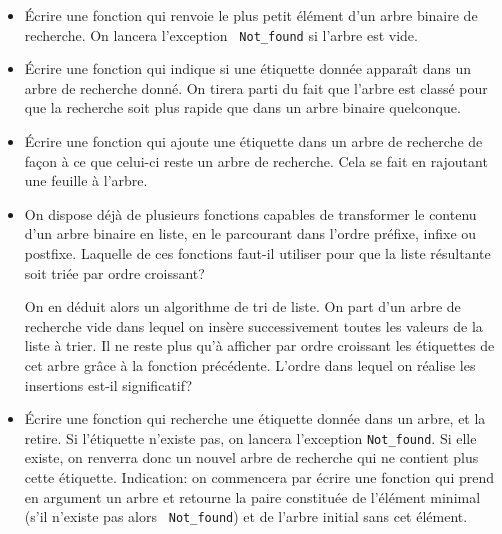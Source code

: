 \documentclass[11pt, a4paper]{article}
\begin{document}
\begin{itemize}

  \item Écrire une fonction qui renvoie le plus petit élément d'un
        arbre binaire de recherche. On lancera l'exception {\tt
        Not\_found} si l'arbre est vide.

  \item Écrire une fonction qui indique si une étiquette donnée
        apparaît dans un arbre de recherche donné. On tirera parti du
        fait que l'arbre est classé pour que la recherche soit plus
        rapide que dans un arbre binaire quelconque.

  \item Écrire une fonction qui ajoute une étiquette dans un arbre de
        recherche de façon à ce que celui-ci reste un arbre de
        recherche. Cela se fait en rajoutant une feuille à l'arbre.

  \item On dispose déjà de plusieurs fonctions capables de transformer
        le contenu d'un arbre binaire en liste, en le parcourant dans
        l'ordre préfixe, infixe ou postfixe. Laquelle de ces fonctions
        faut-il utiliser pour que la liste résultante soit triée par
        ordre croissant?

        On en déduit alors un algorithme de tri de liste. On part d'un
        arbre de recherche vide dans lequel on insère successivement
        toutes les valeurs de la liste à trier. Il ne reste plus qu'à
        afficher par ordre croissant les étiquettes de cet arbre grâce
        à la fonction précédente. L'ordre dans lequel on réalise les
        insertions est-il significatif?

  \item Écrire une fonction qui recherche une étiquette donnée dans un
        arbre, et la retire. Si l'étiquette n'existe pas, on lancera
        l'exception {\tt Not\_found}. Si elle existe, on renverra donc
        un nouvel arbre de recherche qui ne contient plus cette
        étiquette. Indication: on commencera par écrire une fonction
        qui prend en argument un arbre et retourne la paire constituée
        de l'élément minimal (s'il n'existe pas alors {\tt
        Not\_found}) et de l'arbre initial sans cet élément.

\end{itemize}
\end{document}
